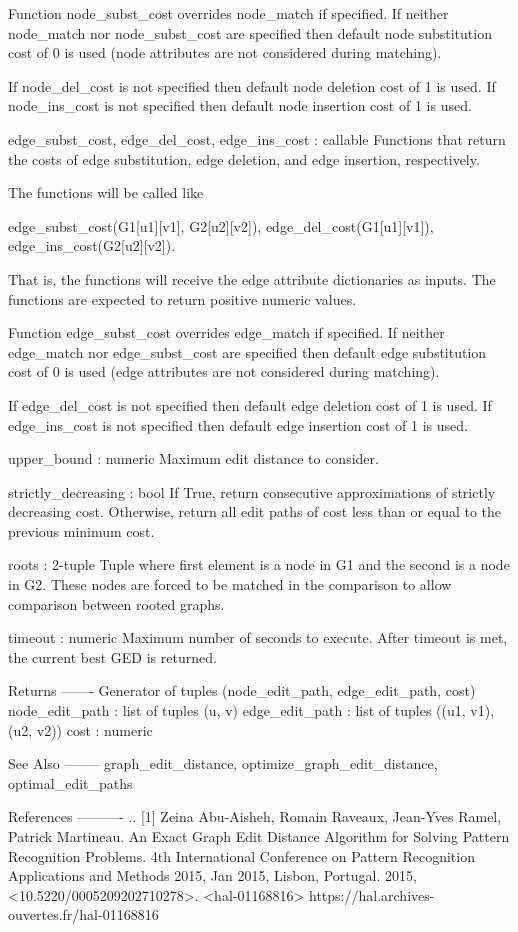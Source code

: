 \begin{DoxyVerb}
    Function node_subst_cost overrides node_match if specified.
    If neither node_match nor node_subst_cost are specified then
    default node substitution cost of 0 is used (node attributes
    are not considered during matching).

    If node_del_cost is not specified then default node deletion
    cost of 1 is used.  If node_ins_cost is not specified then
    default node insertion cost of 1 is used.

edge_subst_cost, edge_del_cost, edge_ins_cost : callable
    Functions that return the costs of edge substitution, edge
    deletion, and edge insertion, respectively.

    The functions will be called like

       edge_subst_cost(G1[u1][v1], G2[u2][v2]),
       edge_del_cost(G1[u1][v1]),
       edge_ins_cost(G2[u2][v2]).

    That is, the functions will receive the edge attribute
    dictionaries as inputs.  The functions are expected to return
    positive numeric values.

    Function edge_subst_cost overrides edge_match if specified.
    If neither edge_match nor edge_subst_cost are specified then
    default edge substitution cost of 0 is used (edge attributes
    are not considered during matching).

    If edge_del_cost is not specified then default edge deletion
    cost of 1 is used.  If edge_ins_cost is not specified then
    default edge insertion cost of 1 is used.

upper_bound : numeric
    Maximum edit distance to consider.

strictly_decreasing : bool
    If True, return consecutive approximations of strictly
    decreasing cost.  Otherwise, return all edit paths of cost
    less than or equal to the previous minimum cost.

roots : 2-tuple
    Tuple where first element is a node in G1 and the second
    is a node in G2.
    These nodes are forced to be matched in the comparison to
    allow comparison between rooted graphs.

timeout : numeric
    Maximum number of seconds to execute.
    After timeout is met, the current best GED is returned.

Returns
-------
Generator of tuples (node_edit_path, edge_edit_path, cost)
    node_edit_path : list of tuples (u, v)
    edge_edit_path : list of tuples ((u1, v1), (u2, v2))
    cost : numeric

See Also
--------
graph_edit_distance, optimize_graph_edit_distance, optimal_edit_paths

References
----------
.. [1] Zeina Abu-Aisheh, Romain Raveaux, Jean-Yves Ramel, Patrick
   Martineau. An Exact Graph Edit Distance Algorithm for Solving
   Pattern Recognition Problems. 4th International Conference on
   Pattern Recognition Applications and Methods 2015, Jan 2015,
   Lisbon, Portugal. 2015,
   <10.5220/0005209202710278>. <hal-01168816>
   https://hal.archives-ouvertes.fr/hal-01168816\end{DoxyVerb}
